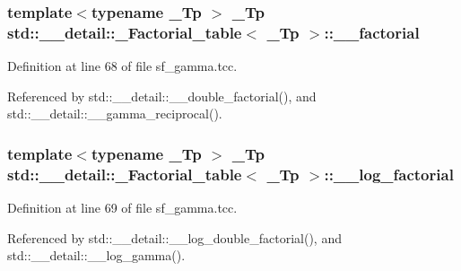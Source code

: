 \subsubsection[{\texorpdfstring{\+\_\+\+\_\+factorial}{__factorial}}]{\setlength{\rightskip}{0pt plus 5cm}template$<$typename \+\_\+\+Tp $>$ \+\_\+\+Tp {\bf std\+::\+\_\+\+\_\+detail\+::\+\_\+\+Factorial\+\_\+table}$<$ \+\_\+\+Tp $>$\+::\+\_\+\+\_\+factorial}\hypertarget{structstd_1_1____detail_1_1__Factorial__table_a4e8d20f3fa301037b097bb9f8e5f2060}{}\label{structstd_1_1____detail_1_1__Factorial__table_a4e8d20f3fa301037b097bb9f8e5f2060}


Definition at line 68 of file sf\+\_\+gamma.\+tcc.



Referenced by std\+::\+\_\+\+\_\+detail\+::\+\_\+\+\_\+double\+\_\+factorial(), and std\+::\+\_\+\+\_\+detail\+::\+\_\+\+\_\+gamma\+\_\+reciprocal().

\subsubsection[{\texorpdfstring{\+\_\+\+\_\+log\+\_\+factorial}{__log_factorial}}]{\setlength{\rightskip}{0pt plus 5cm}template$<$typename \+\_\+\+Tp $>$ \+\_\+\+Tp {\bf std\+::\+\_\+\+\_\+detail\+::\+\_\+\+Factorial\+\_\+table}$<$ \+\_\+\+Tp $>$\+::\+\_\+\+\_\+log\+\_\+factorial}\hypertarget{structstd_1_1____detail_1_1__Factorial__table_a9d4b412d4d8b46ec660b0441516f412c}{}\label{structstd_1_1____detail_1_1__Factorial__table_a9d4b412d4d8b46ec660b0441516f412c}


Definition at line 69 of file sf\+\_\+gamma.\+tcc.



Referenced by std\+::\+\_\+\+\_\+detail\+::\+\_\+\+\_\+log\+\_\+double\+\_\+factorial(), and std\+::\+\_\+\+\_\+detail\+::\+\_\+\+\_\+log\+\_\+gamma().

